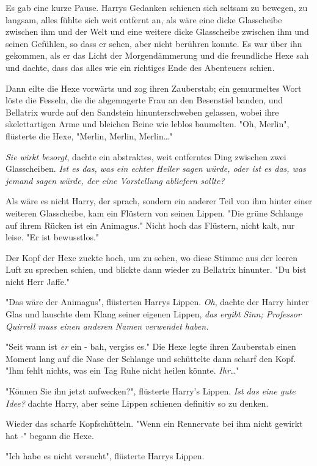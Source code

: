 {Es gab eine kurze Pause. Harrys Gedanken schienen sich seltsam zu bewegen, zu langsam, alles fühlte sich weit entfernt an, als wäre eine dicke Glasscheibe zwischen ihm und der Welt und eine weitere dicke Glasscheibe zwischen ihm und seinen Gefühlen, so dass er sehen, aber nicht berühren konnte. Es war über ihn gekommen, als er das Licht der Morgendämmerung und die freundliche Hexe sah und dachte, dass das alles wie ein richtiges Ende des Abenteuers schien.

Dann eilte die Hexe vorwärts und zog ihren Zauberstab; ein gemurmeltes Wort löste die Fesseln, die die abgemagerte Frau an den Besenstiel banden, und Bellatrix wurde auf den Sandstein hinunterschweben gelassen, wobei ihre skelettartigen Arme und bleichen Beine wie leblos baumelten. "Oh, Merlin", flüsterte die Hexe, "Merlin, Merlin, Merlin…"

\emph{Sie wirkt besorgt}, dachte ein abstraktes, weit entferntes Ding zwischen zwei Glasscheiben. \emph{Ist es das, was ein echter Heiler sagen würde, oder ist es das, was jemand sagen würde, der eine Vorstellung abliefern sollte?}

Als wäre es nicht Harry, der sprach, sondern ein anderer Teil von ihm hinter einer weiteren Glasscheibe, kam ein Flüstern von seinen Lippen. "Die grüne Schlange auf ihrem Rücken ist ein Animagus." Nicht hoch das Flüstern, nicht kalt, nur leise. "Er ist bewusstlos."

Der Kopf der Hexe zuckte hoch, um zu sehen, wo diese Stimme aus der leeren Luft zu sprechen schien, und blickte dann wieder zu Bellatrix hinunter. "Du bist nicht Herr Jaffe."

"Das wäre der Animagus", flüsterten Harrys Lippen. \emph{Oh}, dachte der Harry hinter Glas und lauschte dem Klang seiner eigenen Lippen, \emph{das ergibt Sinn; Professor Quirrell muss einen anderen Namen verwendet haben.}

"Seit wann ist \emph{er} ein - bah, vergiss es." Die Hexe legte ihren Zauberstab einen Moment lang auf die Nase der Schlange und schüttelte dann scharf den Kopf. "Ihm fehlt nichts, was ein Tag Ruhe nicht heilen könnte. \emph{Ihr}…"

"Können Sie ihn jetzt aufwecken?", flüsterte Harry's Lippen. \emph{Ist das eine gute Idee?} dachte Harry, aber seine Lippen schienen definitiv so zu denken.

Wieder das scharfe Kopfschütteln. "Wenn ein Rennervate bei ihm nicht gewirkt hat -" begann die Hexe.

"Ich habe es nicht versucht", flüsterte Harrys Lippen.

}
